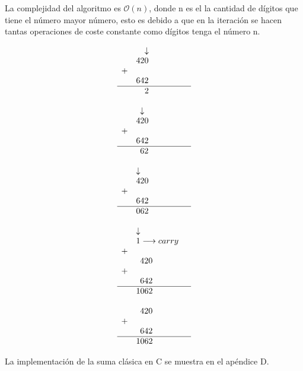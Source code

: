 \documentclass[10pt,journal,compsoc]{IEEEtran}
\begin{document}
La complejidad del algoritmo es $\mathcal{O}(n)$, donde n es el la cantidad de dígitos que tiene el número mayor número, esto es debido a que en la iteración se hacen tantas operaciones de coste constante como dígitos tenga el número n.


\begin{center}
\[
\begin{array}{rl l}
& \hspace{0.36cm} \downarrow \\
& 420 \\
+ \\
& 642 &\\ \hline
& \hspace{0.36cm} 2 &  \\
& &\\
& \hspace{0.17cm} \downarrow \\
& 420 \\
+ \\
& 642 &\\ \hline
& \hspace{0.17cm} 62 &  \\
& &\\
& \downarrow \\
& 420 \\
+ \\
& 642 &\\ \hline
& 062 &  \\
& &\\
& \downarrow \\
& 1 \longrightarrow carry   \\
+ \\
& \hspace{0.17cm} 420 & \\
+ \\
& \hspace{0.17cm} 642 &\\ \hline
& 1062 &  \\
& &\\
&  \hspace{0.17cm} 420 \\
+ \\
&  \hspace{0.17cm} 642 &\\ \hline
& 1062 &  \\
\end{array}
\]
\end{center}

La implementación de la suma clásica en C se muestra en el apéndice D. 
\end{document}
